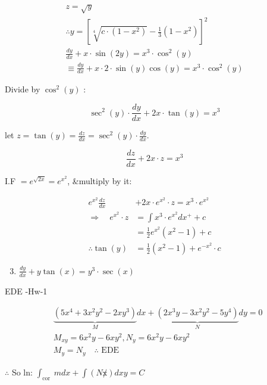 \documentclass[12pt, a4paper]{article}
\begin{document}
$$
	\begin{gathered}
		z=\sqrt{y} \\
		\therefore y=\left[\sqrt[4]{c \cdot\left(1-x^2 \right)}-\frac{1}{3}\left(1-x^2 \right)\right]^{2} \\
		\frac{d y}{d x}+x \cdot \sin(2 y)=x^{3} \cdot \cos ^{2}(y) \\
		\equiv \frac{d y}{d x}+x \cdot 2 \cdot \sin(y) \cos(y)=x^{3} \cdot \cos ^{2}(y)
	\end{gathered}
$$

Divide by $\cos ^{2}(y)$ :

$$
	\sec ^{2}(y) \cdot \frac{d y}{d x}+2 x \cdot \tan(y)=x^{3}
$$

let $z=\tan(y)=\frac{d z}{d x}=\sec ^{2}(y) \cdot \frac{d y}{d x}$.

$$
	\frac{d z}{d x}+2 x \cdot z=x^{3}
$$

I.F $=e^{\sqrt{2 x}}=e^{x^2 }$, \&multiply by it:

$$
	\begin{aligned}
		e^{x^2 } \frac{d z}{d x}           & +2 x \cdot e^{x^2 } \cdot z=x^{3} \cdot e^{x^2 }  \\
		\Rightarrow \quad e^{x^2 } \cdot z & =\int x^{3} \cdot e^{x^2 } d x^{+}+c              \\
		                                   & =\frac{1}{2} e^{x^2 }\left(x^2 -1\right)+c        \\
		\therefore \tan(y)                 & =\frac{1}{2}\left(x^2 -1\right)+e^{-x^2 } \cdot c
	\end{aligned}
$$

\begin{enumerate}
	\setcounter{enumi}{2}
	\item $\frac{d y}{d x}+y \tan(x)=y^{3} \cdot \sec (x)$
\end{enumerate}

EDE -Hw-1

$$
	\begin{aligned}
		 & \underbrace{\left(5 x^{4}+3 x^2 y^2-2 x y^{3}\right)}_{M} d x+\underbrace{\left(2 x^{3} y-3 x^2 y^2-5 y^{4}\right)}_{N} d y=0 \\
		 & M_{x y}=6 x^2 y-6 x y^2, N_{y}=6 x^2 y-6 x y^2                                                                                \\
		 & M_{y}=N_{y} \quad \therefore \text{ EDE }
	\end{aligned}
$$

$\therefore$ So ln: $\int_{\text{cor }} m d x+\int(N \not x) d x y=C$
\end{document}
